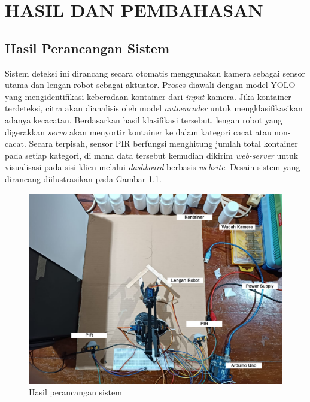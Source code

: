 \chapter{HASIL DAN PEMBAHASAN}
\section{Hasil Perancangan Sistem}
Sistem deteksi ini dirancang secara otomatis
menggunakan kamera sebagai sensor utama dan lengan robot sebagai
aktuator. Proses diawali dengan model YOLO yang mengidentifikasi
keberadaan kontainer dari \textit{input} kamera. Jika kontainer terdeteksi,
citra akan dianalisis oleh model \textit{autoencoder} untuk mengklasifikasikan
adanya kecacatan. Berdasarkan hasil klasifikasi tersebut, lengan
robot yang digerakkan \textit{servo} akan menyortir kontainer ke dalam
kategori cacat atau non-cacat. Secara terpisah, sensor PIR berfungsi
menghitung jumlah total
kontainer pada setiap kategori, di mana data tersebut kemudian
dikirim \textit{web-server} untuk visualisasi pada sisi
klien melalui \textit{dashboard} berbasis \textit{website}. Desain
sistem yang dirancang diilustrasikan pada Gambar \ref{fig:rancang-sistem}.

\begin{figure}[H]
  \centering
  \includegraphics[width=\textwidth]{gambar/rancang_sistem.jpg}
  \caption{Hasil perancangan sistem}
  \label{fig:rancang-sistem}
\end{figure}
\vspace{-1em}

\vspace{1em}

